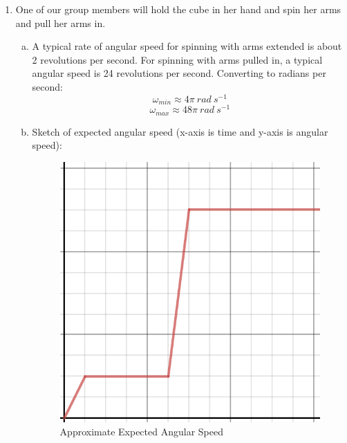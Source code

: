 \documentclass{article}
\begin{document}
\begin{enumerate}[1.]
    \item One of our group members will hold the cube in her hand and spin her
        arms and pull her arms in. 

        \begin{enumerate}[a.]
            \item A typical rate of angular speed for spinning with arms
                extended is about 2 revolutions per second. For spinning with
                arms pulled in, a typical angular speed is 24 revolutions per
                second. Converting to radians per second:
                $$ \omega_{min} \approx 4 \pi\ \si{ rad\ s^{-1} } $$
                $$ \omega_{max} \approx 48 \pi\ \si{ rad\ s^{-1} } $$

            \item Sketch of expected angular speed (x-axis is time and y-axis is
                angular speed):

                \begin{figure}[H]
                    \centering
                    \includegraphics[scale=0.60]{"Sketch"}
                    \caption{Approximate Expected Angular Speed}
                \end{figure}
                
        \end{enumerate}


\end{enumerate}
\end{document}
